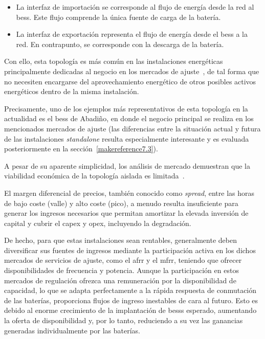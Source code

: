 \begin{itemize}

  \item La interfaz de importación se corresponde al flujo de energía desde la red al \gls{bess}. Este flujo comprende la única fuente de carga de la batería.

  \item  La interfaz de exportación representa el flujo de energía desde el \gls{bess} a la red. En contrapunto, se corresponde con la descarga de la batería.

\end{itemize}

Con ello, esta topología es más común en las instalaciones energéticas principalmente dedicadas al negocio en los mercados de ajuste~\cite{carbajo2007mercados}, de tal forma que no necesiten encargarse del aprovechamiento energético de otros posibles activos energéticos dentro de la misma instalación.

Precisamente, uno de los ejemplos más representativos de esta topología en la actualidad es el \gls{bess} de Abadiño, en donde el negocio principal se realiza en los mencionados mercados de ajuste (las diferencias entre la situación actual y futura de las instalaciones \textit{standalone} resulta especialmente interesante y es evaluada posteriormente en la sección~\ref{makereference7.3}).

A pesar de su aparente simplicidad, los análisis de mercado demuestran que la viabilidad económica de la topología aislada es limitada~\cite{azahra2020optimized, baviskar2023opportunities, kalenderova2024battery}.

El margen diferencial de precios, también conocido como \textit{spread}, entre las horas de bajo coste (valle) y alto coste (pico), a menudo resulta insuficiente para generar los ingresos necesarios que permitan amortizar la elevada inversión de capital y cubrir el \gls{capex} y \gls{opex}, incluyendo la degradación.

De hecho, para que estas instalaciones sean rentables, generalmente deben diversificar sus fuentes de ingresos mediante la participación activa en los dichos mercados de servicios de ajuste, como el \gls{afrr} y el \gls{mfrr}, teniendo que ofrecer disponibilidades de frecuencia y potencia. Aunque la participación en estos mercados de regulación ofrezca una remuneración por la disponibilidad de capacidad, lo que se adapta perfectamente a la rápida respuesta de conmutación de las baterías, proporciona flujos de ingreso inestables de cara al futuro. Esto es debido al enorme crecimiento de la implantación de \glspl{bess} esperado, aumentando la oferta de disponibilidad y, por lo tanto, reduciendo a su vez las ganancias generadas individualmente por las baterías.


